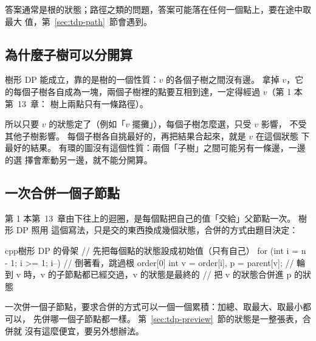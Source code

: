 答案通常是根的狀態；路徑之類的問題，答案可能落在任何一個點上，要在途中取最大
值，第~\ref{sec:tdp-path}~節會遇到。

\subsection{為什麼子樹可以分開算}

樹形 DP 能成立，靠的是樹的一個性質：$v$ 的各個子樹之間沒有邊。 拿掉 $v$，它
的每個子樹各自成為一塊，兩個子樹裡的點要互相到達，一定得經過 $v$（第 1 本第~13~章：
樹上兩點只有一條路徑）。

\begin{center}
\label{fig:tdp-indep}
\end{center}

所以只要 $v$ 的狀態定了（例如「$v$ 擺攤」），每個子樹怎麼選，只受 $v$ 影響，
不受其他子樹影響。 每個子樹各自挑最好的，再把結果合起來，就是 $v$ 在這個狀態
下最好的結果。 有環的圖沒有這個性質：兩個「子樹」之間可能另有一條邊，一邊的選
擇會牽動另一邊，就不能分開算。

\subsection{一次合併一個子節點}

第 1 本第~13~章由下往上的迴圈，是每個點把自己的值「交給」父節點一次。 樹形 DP 照用
這個寫法，只是交的東西換成幾個狀態，合併的方式由題目決定：

\begin{code}{cpp}{樹形 DP 的骨架}
// 先把每個點的狀態設成初始值（只有自己）
for (int i = n - 1; i >= 1; i--) {      // 倒著看，跳過根 order[0]
    int v = order[i], p = parent[v];
    // 輪到 v 時，v 的子節點都已經交過，v 的狀態是最終的
    // 把 v 的狀態合併進 p 的狀態
}
\end{code}

一次併一個子節點，要求合併的方式可以一個一個累積：加總、取最大、取最小都可以，
先併哪一個子節點都一樣。 第~\ref{sec:tdp-preview}~節的狀態是一整張表，合併就
沒有這麼便宜，要另外想辦法。

